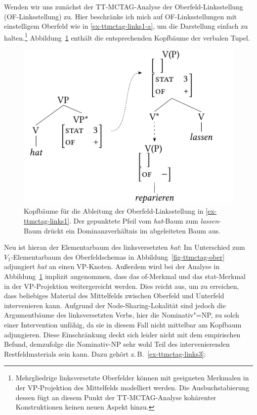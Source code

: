 Wenden wir uns zunächst der TT-MCTAG-Analyse der Oberfeld-Links\-stel\-lung (OF-Links\-stellung) zu. Hier beschränke ich mich auf OF-Linksstellungen mit einstelligem Oberfeld wie in \ref{ex-ttmctag-links1-a}, um die Darstellung einfach zu halten.\footnote{Mehrgliedrige linksversetzte Oberfelder können mit geeigneten Merkmalen in der VP-Projektion des Mittelfelds modelliert werden. Die Ausbuchstabierung dessen fügt an diesem Punkt  der TT-MCTAG-Analyse kohärenter Konstruktionen keinen neuen Aspekt hinzu.} Abbildung~\ref{fig-ttmctag-links1} enthält die entsprechenden Kopfbäume der verbalen Tupel.  
\begin{figure}[t]
\centering
\includegraphics{graphics/abb717.pdf}
\caption{\label{fig-ttmctag-links1}Kopfbäume für die Ableitung der Oberfeld-Linksstellung in \ref{ex-ttmctag-links1}. Der gepunktete Pfeil vom {\it hat}-Baum zum {\it lassen}-Baum drückt ein Dominanzverhältnis im abgeleiteten Baum aus.}
\end{figure}
Neu ist hieran der Elementarbaum des linksversetzten {\it hat}: Im Unterschied zum $V_1$-Elementarbaum des Oberfeldschemas in Abbildung~\ref{fig-ttmctag-ober} adjungiert {\it hat} an einen VP-Knoten. Au\ss erdem wird bei der Analyse in Abbildung~\ref{fig-ttmctag-links1} implizit angenommen, dass das {\sc of}-Merkmal und das {\sc stat}-Merkmal in der VP-Projektion weitergereicht werden. Dies reicht aus, um zu erreichen, dass beliebiges Material des Mittelfelds zwischen Oberfeld und Unterfeld intervenieren kann. Aufgrund der Node-Sharing-Lokalität sind jedoch die Argumentbäume des linksversetzten Verbs, hier die Nominativ"=NP, zu solch einer Intervention unfähig, da sie in diesem Fall nicht mittelbar am Kopfbaum adjungieren. Diese Einschränkung deckt sich leider nicht mit dem empirischen Befund, demzufolge die Nominativ-NP sehr wohl Teil des intervenierenden Restfeldmaterials sein kann. Dazu gehört z.\,B.\ \ref{ex-ttmctag-links3}: 

